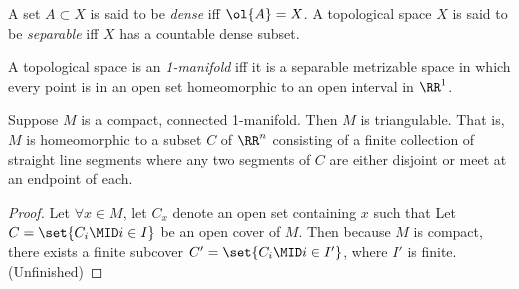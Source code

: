 \begin{recall}
  A set $A \subset X$ is said to be \emph{dense} iff $\ol{A} = X$. A topological
  space $X$ is said to be \emph{separable} iff $X$ has a countable dense subset.
\end{recall}

\begin{definition}[1-manifold]
  A topological space is an \emph{1-manifold} iff it is a separable metrizable
  space in which every point is in an open set homeomorphic to an open interval
  in $\RR^1$.
\end{definition}
\begin{problem}[12.4]
  Suppose $M$ is a compact, connected 1-manifold. Then $M$ is triangulable. That
  is, $M$ is homeomorphic to a subset $C$ of $\RR^n$ consisting of a finite
  collection of straight line segments where any two segments of $C$ are either
  disjoint or meet at an endpoint of each.
\end{problem}
\begin{proof}
  Let $\forall x \in M$, let $C_x$ denote an open set containing $x$ such that
  Let $C = \set{C_i \MID i \in I}$ be an open cover of $M$. Then because $M$ is
  compact, there exists a finite subcover $C' = \set{C_i \MID i \in I'}$, where
  $I'$ is finite. (Unfinished)
\end{proof}

